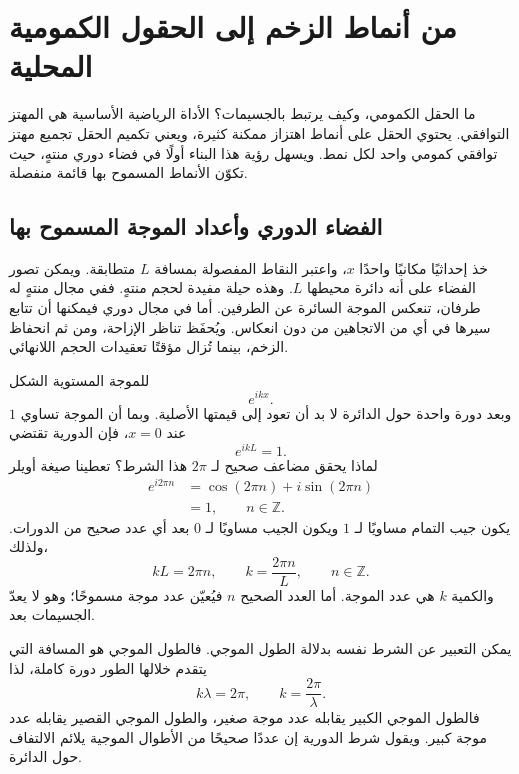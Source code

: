 \chapter{من أنماط الزخم إلى الحقول الكمومية المحلية}

ما الحقل الكمومي، وكيف يرتبط بالجسيمات؟ الأداة الرياضية الأساسية هي المهتز التوافقي. يحتوي الحقل على أنماط اهتزاز ممكنة كثيرة، ويعني تكميم الحقل تجميع مهتز توافقي كمومي واحد لكل نمط. ويسهل رؤية هذا البناء أولًا في فضاء دوري منتهٍ، حيث تكوّن الأنماط المسموح بها قائمة منفصلة.

\section{الفضاء الدوري وأعداد الموجة المسموح بها}

خذ إحداثيًا مكانيًا واحدًا \(x\)، واعتبر النقاط المفصولة بمسافة \(L\) متطابقة. ويمكن تصور الفضاء على أنه دائرة محيطها \(L\). وهذه حيلة مفيدة لحجم منتهٍ. ففي مجال منتهٍ له طرفان، تنعكس الموجة السائرة عن الطرفين. أما في مجال دوري فيمكنها أن تتابع سيرها في أي من الاتجاهين من دون انعكاس. ويُحفَظ تناظر الإزاحة، ومن ثم انحفاظ الزخم، بينما تُزال مؤقتًا تعقيدات الحجم اللانهائي.

للموجة المستوية الشكل
\begin{equation}
e^{ikx}.
\end{equation}
وبعد دورة واحدة حول الدائرة لا بد أن تعود إلى قيمتها الأصلية. وبما أن الموجة تساوي \(1\) عند \(x=0\)، فإن الدورية تقتضي
\begin{equation}
e^{ikL}=1.
\end{equation}
لماذا يحقق مضاعف صحيح لـ \(2\pi\) هذا الشرط؟ تعطينا صيغة أويلر
\begin{align}
e^{i2\pi n}
&=\cos(2\pi n)+i\sin(2\pi n)\\
&=1,
\qquad n\in\mathbb Z.
\end{align}
يكون جيب التمام مساويًا لـ \(1\) ويكون الجيب مساويًا لـ \(0\) بعد أي عدد صحيح من الدورات. ولذلك،
\begin{equation}
kL=2\pi n,
\qquad
k=\frac{2\pi n}{L},
\qquad n\in\mathbb Z.
\end{equation}
والكمية \(k\) هي عدد الموجة. أما العدد الصحيح \(n\) فيُعيّن عدد موجة مسموحًا؛ وهو لا يعدّ الجسيمات بعد.

يمكن التعبير عن الشرط نفسه بدلالة الطول الموجي. فالطول الموجي هو المسافة التي يتقدم خلالها الطور دورة كاملة، لذا
\begin{equation}
k\lambda=2\pi,
\qquad
k=\frac{2\pi}{\lambda}.
\end{equation}
فالطول الموجي الكبير يقابله عدد موجة صغير، والطول الموجي القصير يقابله عدد موجة كبير. ويقول شرط الدورية إن عددًا صحيحًا من الأطوال الموجية يلائم الالتفاف حول الدائرة.

